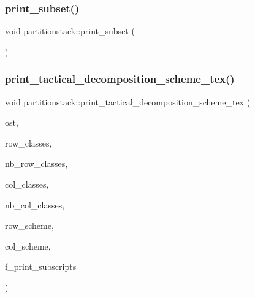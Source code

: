 \mbox{\label{classpartitionstack_a098714bf14613bfd7feebde5f28474ed}} 
\subsubsection{\texorpdfstring{print\+\_\+subset()}{print\_subset()}}
{\footnotesize\ttfamily void partitionstack\+::print\+\_\+subset (\begin{DoxyParamCaption}{ }\end{DoxyParamCaption})}

\mbox{\label{classpartitionstack_a9ceab7213afcbf44b98106f51cb05c8d}} 
\subsubsection{\texorpdfstring{print\+\_\+tactical\+\_\+decomposition\+\_\+scheme\+\_\+tex()}{print\_tactical\_decomposition\_scheme\_tex()}}
{\footnotesize\ttfamily void partitionstack\+::print\+\_\+tactical\+\_\+decomposition\+\_\+scheme\+\_\+tex (\begin{DoxyParamCaption}\item[{ostream \&}]{ost,  }\item[{\mbox{\hyperlink{galois_8h_a09fddde158a3a20bd2dcadb609de11dc}{I\+NT}} $\ast$}]{row\+\_\+classes,  }\item[{\mbox{\hyperlink{galois_8h_a09fddde158a3a20bd2dcadb609de11dc}{I\+NT}}}]{nb\+\_\+row\+\_\+classes,  }\item[{\mbox{\hyperlink{galois_8h_a09fddde158a3a20bd2dcadb609de11dc}{I\+NT}} $\ast$}]{col\+\_\+classes,  }\item[{\mbox{\hyperlink{galois_8h_a09fddde158a3a20bd2dcadb609de11dc}{I\+NT}}}]{nb\+\_\+col\+\_\+classes,  }\item[{\mbox{\hyperlink{galois_8h_a09fddde158a3a20bd2dcadb609de11dc}{I\+NT}} $\ast$}]{row\+\_\+scheme,  }\item[{\mbox{\hyperlink{galois_8h_a09fddde158a3a20bd2dcadb609de11dc}{I\+NT}} $\ast$}]{col\+\_\+scheme,  }\item[{\mbox{\hyperlink{galois_8h_a09fddde158a3a20bd2dcadb609de11dc}{I\+NT}}}]{f\+\_\+print\+\_\+subscripts }\end{DoxyParamCaption})}

